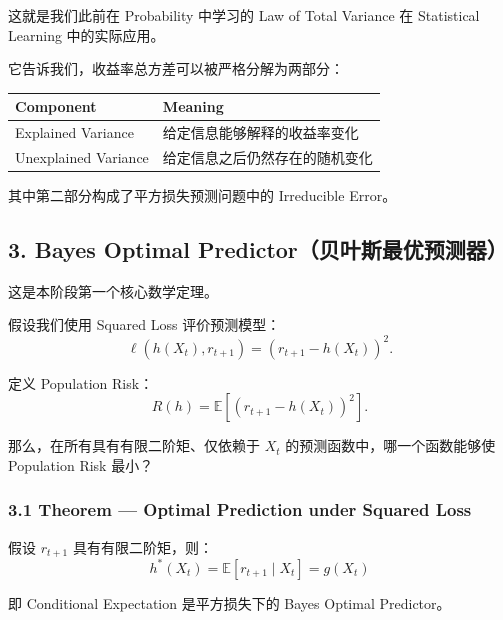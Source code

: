 这就是我们此前在 Probability 中学习的 Law of Total Variance 在 Statistical Learning 中的实际应用。

它告诉我们，收益率总方差可以被严格分解为两部分：

\begin{readertable}
\begin{longtable}[]{@{}
  >{\raggedright\arraybackslash}p{}
  >{\raggedright\arraybackslash}p{}@{}}
\toprule
Component & Meaning \\
\midrule
\endhead
Explained Variance & 给定信息能够解释的收益率变化 \\
Unexplained Variance & 给定信息之后仍然存在的随机变化 \\
\bottomrule
\end{longtable}
\end{readertable}

其中第二部分构成了平方损失预测问题中的 Irreducible Error。

\hypertarget{part-4-60-0001-bayes-optimal-predictorux8d1dux53f6ux65afux6700ux4f18ux9884ux6d4bux5668}{%
\subsection{3. Bayes Optimal Predictor（贝叶斯最优预测器）}\label{part-4-60-0001-bayes-optimal-predictorux8d1dux53f6ux65afux6700ux4f18ux9884ux6d4bux5668}}

这是本阶段第一个核心数学定理。

假设我们使用 Squared Loss 评价预测模型：
\[\ell(h(X_t),r_{t+1})
=
(r_{t+1}-h(X_t))^2.\]

定义 Population Risk：
\[R(h)
=
\mathbb E[(r_{t+1}-h(X_t))^2].\]

那么，在所有具有有限二阶矩、仅依赖于 \(X_t\) 的预测函数中，哪一个函数能够使 Population Risk 最小？

\hypertarget{part-4-60-0001-theorem-optimal-prediction-under-squared-loss}{%
\subsubsection{3.1 Theorem --- Optimal Prediction under Squared Loss}\label{part-4-60-0001-theorem-optimal-prediction-under-squared-loss}}

假设 \(r_{t+1}\) 具有有限二阶矩，则：
\[\boxed{
h^*(X_t)
=
\mathbb E[r_{t+1}\mid X_t]
=
g(X_t)
}\]

即 Conditional Expectation 是平方损失下的 Bayes Optimal Predictor。


